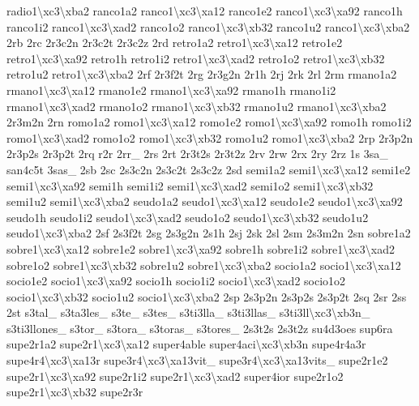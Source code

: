 {radio1\textbackslash{}xc3\textbackslash{}xba2 ranco1a2 ranco1\textbackslash{}xc3\textbackslash{}xa12 ranco1e2 ranco1\textbackslash{}xc3\textbackslash{}xa92 ranco1h ranco1i2 ranco1\textbackslash{}xc3\textbackslash{}xad2 ranco1o2 ranco1\textbackslash{}xc3\textbackslash{}xb32 ranco1u2 ranco1\textbackslash{}xc3\textbackslash{}xba2 2rb 2rc 2r3c2n 2r3c2t 2r3c2z 2rd retro1a2 retro1\textbackslash{}xc3\textbackslash{}xa12 retro1e2 retro1\textbackslash{}xc3\textbackslash{}xa92 retro1h retro1i2 retro1\textbackslash{}xc3\textbackslash{}xad2 retro1o2 retro1\textbackslash{}xc3\textbackslash{}xb32 retro1u2 retro1\textbackslash{}xc3\textbackslash{}xba2 2rf 2r3f2t 2rg 2r3g2n 2r1h 2rj 2rk 2rl 2rm rmano1a2 rmano1\textbackslash{}xc3\textbackslash{}xa12 rmano1e2 rmano1\textbackslash{}xc3\textbackslash{}xa92 rmano1h rmano1i2 rmano1\textbackslash{}xc3\textbackslash{}xad2 rmano1o2 rmano1\textbackslash{}xc3\textbackslash{}xb32 rmano1u2 rmano1\textbackslash{}xc3\textbackslash{}xba2 2r3m2n 2rn romo1a2 romo1\textbackslash{}xc3\textbackslash{}xa12 romo1e2 romo1\textbackslash{}xc3\textbackslash{}xa92 romo1h romo1i2 romo1\textbackslash{}xc3\textbackslash{}xad2 romo1o2 romo1\textbackslash{}xc3\textbackslash{}xb32 romo1u2 romo1\textbackslash{}xc3\textbackslash{}xba2 2rp 2r3p2n 2r3p2s 2r3p2t 2rq r2r 2rr\-\_\- 2rs 2rt 2r3t2s 2r3t2z 2rv 2rw 2rx 2ry 2rz 1s 3sa\-\_\- san4c5t 3sas\-\_\- 2sb 2sc 2s3c2n 2s3c2t 2s3c2z 2sd semi1a2 semi1\textbackslash{}xc3\textbackslash{}xa12 semi1e2 semi1\textbackslash{}xc3\textbackslash{}xa92 semi1h semi1i2 semi1\textbackslash{}xc3\textbackslash{}xad2 semi1o2 semi1\textbackslash{}xc3\textbackslash{}xb32 semi1u2 semi1\textbackslash{}xc3\textbackslash{}xba2 seudo1a2 seudo1\textbackslash{}xc3\textbackslash{}xa12 seudo1e2 seudo1\textbackslash{}xc3\textbackslash{}xa92 seudo1h seudo1i2 seudo1\textbackslash{}xc3\textbackslash{}xad2 seudo1o2 seudo1\textbackslash{}xc3\textbackslash{}xb32 seudo1u2 seudo1\textbackslash{}xc3\textbackslash{}xba2 2sf 2s3f2t 2sg 2s3g2n 2s1h 2sj 2sk 2sl 2sm 2s3m2n 2sn sobre1a2 sobre1\textbackslash{}xc3\textbackslash{}xa12 sobre1e2 sobre1\textbackslash{}xc3\textbackslash{}xa92 sobre1h sobre1i2 sobre1\textbackslash{}xc3\textbackslash{}xad2 sobre1o2 sobre1\textbackslash{}xc3\textbackslash{}xb32 sobre1u2 sobre1\textbackslash{}xc3\textbackslash{}xba2 socio1a2 socio1\textbackslash{}xc3\textbackslash{}xa12 socio1e2 socio1\textbackslash{}xc3\textbackslash{}xa92 socio1h socio1i2 socio1\textbackslash{}xc3\textbackslash{}xad2 socio1o2 socio1\textbackslash{}xc3\textbackslash{}xb32 socio1u2 socio1\textbackslash{}xc3\textbackslash{}xba2 2sp 2s3p2n 2s3p2s 2s3p2t 2sq 2sr 2ss 2st s3tal\-\_\- s3ta3les\-\_\- s3te\-\_\- s3tes\-\_\- s3ti3lla\-\_\- s3ti3llas\-\_\- s3ti3ll\textbackslash{}xc3\textbackslash{}xb3n\-\_\- s3ti3llones\-\_\- s3tor\-\_\- s3tora\-\_\- s3toras\-\_\- s3tores\-\_\- 2s3t2s 2s3t2z su4d3oes sup6ra supe2r1a2 supe2r1\textbackslash{}xc3\textbackslash{}xa12 super4able super4aci\textbackslash{}xc3\textbackslash{}xb3n supe4r4a3r supe4r4\textbackslash{}xc3\textbackslash{}xa13r supe3r4\textbackslash{}xc3\textbackslash{}xa13vit\-\_\- supe3r4\textbackslash{}xc3\textbackslash{}xa13vits\-\_\- supe2r1e2 supe2r1\textbackslash{}xc3\textbackslash{}xa92 supe2r1i2 supe2r1\textbackslash{}xc3\textbackslash{}xad2 super4ior supe2r1o2 supe2r1\textbackslash{}xc3\textbackslash{}xb32 supe2r3r }
